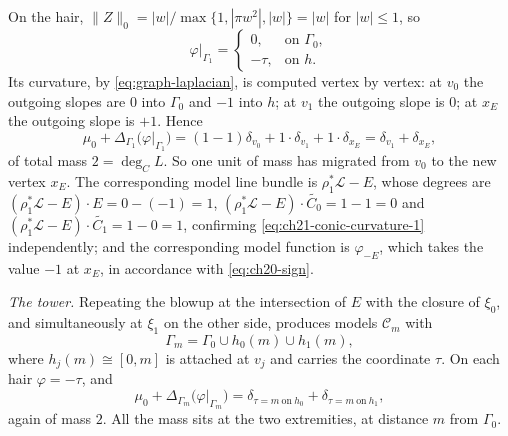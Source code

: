 \begin{example}
On the hair, \(\lVert Z\rVert_0=|w|/\max\{1,|\pi w^2|,|w|\}=|w|\) for
\(|w|\leq1\), so
\begin{equation}
\label{eq:ch21-conic-restriction-1}
 \varphi|_{\Gamma_1}=
 \begin{cases}
  0, & \text{on }\Gamma_0,\\
  -\tau, & \text{on }h .
 \end{cases}
\end{equation}
Its curvature, by \eqref{eq:graph-laplacian}, is computed vertex by vertex:
at \(v_0\) the outgoing slopes are \(0\) into \(\Gamma_0\) and \(-1\) into
\(h\); at \(v_1\) the outgoing slope is \(0\); at \(x_E\) the outgoing slope
is \(+1\).  Hence
\begin{equation}
\label{eq:ch21-conic-curvature-1}
 \mu_0+\Delta_{\Gamma_1}\bigl(\varphi|_{\Gamma_1}\bigr)
 =(1-1)\delta_{v_0}+1\cdot\delta_{v_1}+1\cdot\delta_{x_E}
 =\delta_{v_1}+\delta_{x_E},
\end{equation}
of total mass \(2=\deg_CL\).  So one unit of mass has migrated from
\(v_0\) to the new vertex \(x_E\).  The corresponding model line bundle is
\(\rho_1^*\mathcal L-E\), whose degrees are
\((\rho_1^*\mathcal L-E)\cdot E=0-(-1)=1\),
\((\rho_1^*\mathcal L-E)\cdot\widetilde{C_0}=1-1=0\) and
\((\rho_1^*\mathcal L-E)\cdot\widetilde{C_1}=1-0=1\), confirming
\eqref{eq:ch21-conic-curvature-1} independently; and the corresponding
model function is \(\varphi_{-E}\), which takes the value \(-1\) at
\(x_E\), in accordance with \eqref{eq:ch20-sign}.

\emph{The tower.}  Repeating the blowup at the intersection of \(E\) with
the closure of \(\xi_0\), and simultaneously at \(\xi_1\) on the other side,
produces models \(\mathcal C_m\) with
\[
 \Gamma_m=\Gamma_0\cup h_0(m)\cup h_1(m),
\]
where \(h_j(m)\cong[0,m]\) is attached at \(v_j\) and carries the
coordinate \(\tau\).  On each hair \(\varphi=-\tau\), and
\begin{equation}
\label{eq:ch21-conic-curvature-m}
 \mu_0+\Delta_{\Gamma_m}\bigl(\varphi|_{\Gamma_m}\bigr)
 =\delta_{\tau=m\ \text{on}\ h_0}+\delta_{\tau=m\ \text{on}\ h_1},
\end{equation}
again of mass \(2\).  All the mass sits at the two extremities, at distance
\(m\) from \(\Gamma_0\).


\end{example}
